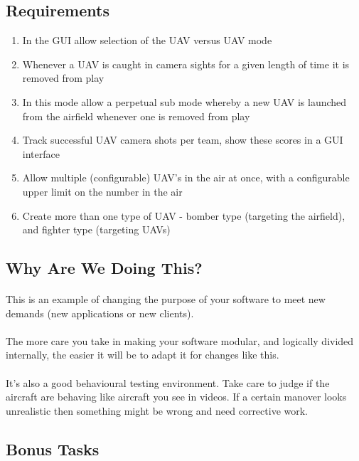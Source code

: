 \documentclass[11pt]{book}
\begin{document}
\subsection{Requirements}

\begin{enumerate}
\item In the GUI allow selection of the UAV versus UAV mode
\item Whenever a UAV is caught in camera sights for a given length of time it is removed from play
\item In this mode allow a perpetual sub mode whereby a new UAV is launched from the airfield whenever one is removed from play
\item Track successful UAV camera shots per team, show these scores in a GUI interface
\item Allow multiple (configurable) UAV's in the air at once, with a configurable upper limit on the number in the air
\item Create more than one type of UAV - bomber type (targeting the airfield), and fighter type (targeting UAVs)
\end{enumerate}

\subsection{Why Are We Doing This?}

\paragraph{} This is an example of changing the purpose of your software to meet new demands (new applications or new clients).

\paragraph{} The more care you take in making your software modular, and logically divided internally, the easier it will be to adapt it for changes like this.

\paragraph{} It's also a good behavioural testing environment. Take care to judge if the aircraft are behaving like aircraft you see in videos. If a certain manover looks unrealistic then something might be wrong and need corrective work. 

\subsection{Bonus Tasks}
\end{document}
